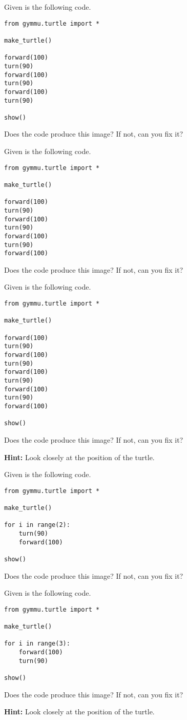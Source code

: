 \documentclass[11pt,a4paper]{report}
\begin{document}
\begin{ex}
Given is the following code.
\begin{lstlisting}
from gymmu.turtle import *

make_turtle()

forward(100)
turn(90)
forward(100)
turn(90)
forward(100)
turn(90)

show()
\end{lstlisting}
Does the code produce this image? If not, can you fix it?
\end{ex}

\begin{ex}
Given is the following code.
\begin{lstlisting}
from gymmu.turtle import *

make_turtle()

forward(100)
turn(90)
forward(100)
turn(90)
forward(100)
turn(90)
forward(100)
\end{lstlisting}
Does the code produce this image? If not, can you fix it?
\end{ex}


\begin{ex}
Given is the following code.
\begin{lstlisting}
from gymmu.turtle import *

make_turtle()

forward(100)
turn(90)
forward(100)
turn(90)
forward(100)
turn(90)
forward(100)
turn(90)
forward(100)

show()
\end{lstlisting}
Does the code produce this image? If not, can you fix it?

\textbf{Hint:} Look closely at the position of the turtle.
\end{ex}


\begin{ex}
Given is the following code.
\begin{lstlisting}
from gymmu.turtle import *

make_turtle()

for i in range(2):
    turn(90)
    forward(100)

show()
\end{lstlisting}
Does the code produce this image? If not, can you fix it?
\end{ex}

\begin{ex}
Given is the following code.
\begin{lstlisting}
from gymmu.turtle import *

make_turtle()

for i in range(3):
    forward(100)
    turn(90)

show()
\end{lstlisting}
Does the code produce this image? If not, can you fix it?

\textbf{Hint:} Look closely at the position of the turtle.
\end{ex}
\end{document}
